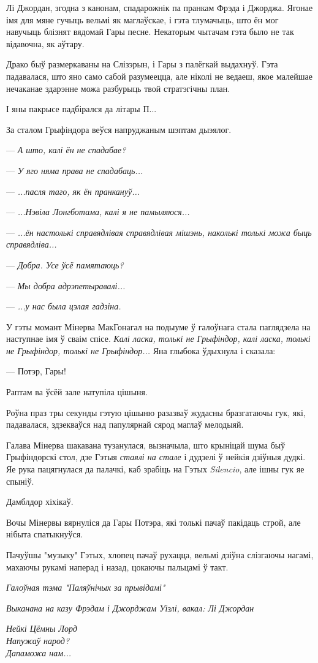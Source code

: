 Лі Джордан, згодна з канонам, спадарожнік па пранкам Фрэда і Джорджа.
Ягонае імя для мяне гучыць вельмі як маглаўскае, і гэта тлумачыць, што ён
мог навучыць блізнят вядомай Гары песне. Некаторым чытачам гэта было не так
відавочна, як аўтару.


\later


Драко быў размеркаваны на Слізэрын, і Гары з палёгкай выдахнуў. 
Гэта падавалася, што яно само сабой разумеецца, але ніколі не ведаеш, якое
малейшае нечаканае здарэнне можа разбурыць твой стратэгічны план.

І яны пакрысе падбірался да літары П...

За сталом Грыфіндора веўся напруджаным шэптам дыэялог. 


--- \emph{А што, калі ён не спадабае?}

--- \emph{У яго няма права не спадабаць...}

--- \emph{...пасля таго, як ён пранкануў...}

--- \emph{...Нэвіла Лонгботама, калі я не памыляюся...}

--- \emph{...ён настолькі справядлівая справядлівая мішэнь, наколькі толькі можа быць справядліва...}

--- \emph{Добра. Усе ўсё памятаюць?}

--- \emph{Мы добра адрэпетыравалі...}

--- \emph{...у нас была цэлая гадзіна.}


У гэты момант Мінерва МакГонагал на подыуме ў галоўнага стала паглядзела на 
наступнае імя ў сваім спісе. \emph{Калі ласка, толькі не Грыфіндор,
калі ласка, толькі не Грыфіндор,  толькі не Грыфіндор...}
Яна глыбока ўдыхнула і сказала:

--- Потэр, Гары!

Раптам ва ўсёй зале натупіла цішыня.

Роўна праз тры секунды гэтую цішыню разазваў жудасны бразгатаючы гук,
які, падавалася, здзекваўся над папулярнай сярод маглаў мелодыяй.

Галава Мінерва шакавана тузанулася, вызначыла, што крыніцай шума быў 
Грыфіндорскі стол, дзе Гэтыя \emph{стаялі на стале} і дудзелі ў нейкія 
дзіўныя дудкі. Яе рука пацягнулася да палачкі, каб зрабіць на Гэтых 
\emph{Silencio}, але ішны гук яе спыніў.

Дамблдор хіхікаў.

Вочы Мінервы вярнуліся да Гары Потэра, які толькі пачаў пакідаць строй, але 
нібыта спатыкнуўся.

Пачуўшы "музыку" Гэтых, хлопец пачаў рухацца, вельмі дзіўна слізгаючы нагамі,
махаючы рукамі наперад і назад, цокаючы пальцамі ў такт.
\begin{center}

\emph{Галоўная тэма "Паляўнічых за прывідамі"}

\emph{Выканана на казу Фрэдам і Джорджам Уізлі, вакал: Лі Джордан}

\medskip

\emph{Нейкі Цёмны Лорд\\
Напужаў народ?\\
Дапаможа нам...}
\end{center}


